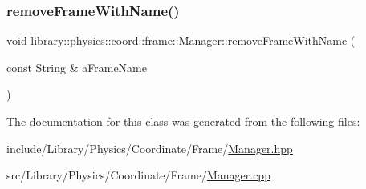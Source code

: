 \mbox{\label{classlibrary_1_1physics_1_1coord_1_1frame_1_1_manager_a63e05e289d34f354dafefbff2b8478af}} 
\subsubsection{\texorpdfstring{remove\+Frame\+With\+Name()}{removeFrameWithName()}}
{\footnotesize\ttfamily void library\+::physics\+::coord\+::frame\+::\+Manager\+::remove\+Frame\+With\+Name (\begin{DoxyParamCaption}\item[{const String \&}]{a\+Frame\+Name }\end{DoxyParamCaption})}



The documentation for this class was generated from the following files\+:\begin{DoxyCompactItemize}
\item 
include/\+Library/\+Physics/\+Coordinate/\+Frame/\hyperlink{_coordinate_2_frame_2_manager_8hpp}{Manager.\+hpp}\item 
src/\+Library/\+Physics/\+Coordinate/\+Frame/\hyperlink{_coordinate_2_frame_2_manager_8cpp}{Manager.\+cpp}\end{DoxyCompactItemize}
